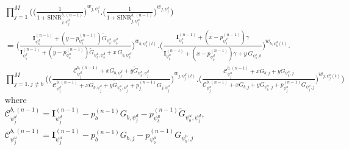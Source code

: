 \documentclass[journal]{IEEEtran}
\newcounter{mytempeqncnt}
\begin{document}
\begin{figure*}[!t]
\normalsize
\setcounter{mytempeqncnt}{\value{equation}}
\setcounter{equation}{28}
\begin{equation}\label{DS18}
\begin{split}
& \textstyle {\prod_{j = 1}^{M} \Bigg( \bigg( \frac{1}{1+{\text{SINR}}^{b,(n-1)}_{j,\psi_j^d}}\bigg)^{w_{j,\psi_j^d}}. \bigg( \frac{1}{1+{\text{SINR}}^{b,(n-1)}_{j,\psi_j^u}}\bigg)^{w_{j,\psi_j^u}} \Bigg)} \\
 &= \textstyle { \bigg( \frac{\boldsymbol{\text{I}}_{\psi_b^d}^{(n-1)} + (y- p_{\psi_b^u}^{(n-1)}) \widetilde{G}_{\psi_b^u, \psi_b^d}}{\boldsymbol{\text{I}}_{\psi_b^d}^{(n-1)} + (y- p_{\psi_b^u}^{(n-1)}) \widetilde{G}_{\psi_b^u, \psi_b^d} + x~{G}_{b,\psi_b^d} }\bigg)^{w_{b,\psi_b^d(t)}}}. \scriptstyle { \bigg( \frac{\boldsymbol{\text{I}}_{\psi_b^u}^{(n-1)} + (x- p_{\psi_b^d}^{(n-1)}) \gamma}{\boldsymbol{\text{I}}_{\psi_b^u}^{(n-1)} + (x- p_{\psi_b^d}^{(n-1)}) \gamma + y~{G}_{\psi_b^u,b}}\bigg)^{w_{b,\psi_b^d(t)}}}. \\
&\textstyle { \prod_{j=1, j \neq b}^M \Bigg( \bigg( \frac{\mathcal{C}_{\psi_j^d}^{b,(n-1)} +  x {G}_{b,\psi_j^d} + y \widetilde{G}_{\psi_b^u,\psi_j^d}}{\mathcal{C}_{\psi_j^d}^{b,(n-1)} +  x {G}_{b,\psi_j^d} + y \widetilde{G}_{\psi_b^u,\psi_j^d} + p_{j}^{(n-1)}{G}_{j,\psi_j^d} }\bigg)^{w_{j,\psi_j^d(t)}}}. \scriptstyle {  \bigg( \frac{\mathcal{C}_{\psi_j^u}^{b,(n-1)} + x {G}_{b,j} + y {G}_{\psi_b^u,j}}{\mathcal{C}_{\psi_j^u}^{b,(n-1)} + x {G}_{b,j} + y {G}_{\psi_b^u,j} +p_{\psi_j^u}^{(n-1)}{G}_{\psi_j^u,j}  }\bigg)^{w_{j,\psi_j^u(t)}} \Bigg)} \\
&\text{where} \\
&\mathcal{C}_{\psi_j^d}^{b,(n-1)} = \boldsymbol{\text{I}}_{\psi_j^d}^{(n-1)} - p_b^{(n-1)} {G}_{b,\psi_j^d} - p_{\psi_b^u}^{(n-1)} \widetilde{G}_{\psi_b^u,\psi_j^d}, \\
&\mathcal{C}_{\psi_j^u}^{b,(n-1)} = \boldsymbol{\text{I}}_{\psi_j^u}^{(n-1)} - p_b^{(n-1)} {G}_{b,j} - p_{\psi_b^u}^{(n-1)} {G}_{\psi_b^u,j}
\end{split}
\end{equation}
\setcounter{equation}{29}
\hrulefill
\vspace*{4pt}
\end{figure*}
\end{document}

